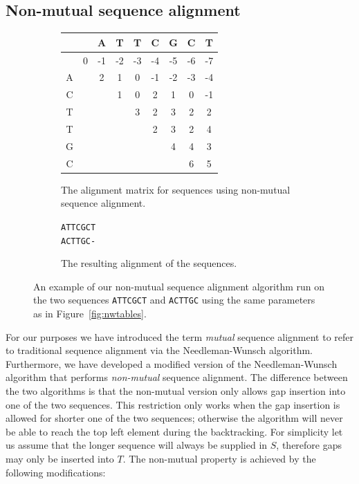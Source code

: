 \documentclass[a4paper]{report}
\begin{document}
\subsection{Non-mutual sequence alignment}
\label{sec:nonmutualalign}

\begin{figure}[t]
    \begin{subfigure}[b]{0.55\textwidth}
        \centering
        \begin{tabular}{| c | c | c | c | c | c | c | c | c |}
            \hline
            & & A & T & T & C & G & C & T \\ \hline
            &\cellcolor[gray]{0.9}0 & -1 & -2 & -3 & -4 & -5 & -6 & -7 \\
            \hline
            A & &\cellcolor[gray]{0.9}2 & 1 & 0 & -1 & -2 & -3 & -4 \\
            \hline
            C & & &\cellcolor[gray]{0.9}1 & 0 & 2 & 1 & 0 & -1 \\ \hline
            T & & & &\cellcolor[gray]{0.9}3 & 2 & 3 & 2 & 2 \\ \hline
            T & & & & &\cellcolor[gray]{0.9}2 & 3 & 2 & 4 \\ \hline
            G & & & & & &\cellcolor[gray]{0.9}4 & 4 & 3 \\ \hline
            C & & & & & & &\cellcolor[gray]{0.9}6 &
            \cellcolor[gray]{0.9}5 \\ \hline
        \end{tabular}
        \caption{The alignment matrix for sequences using non-mutual sequence
        alignment.}
        \label{fig:nonmutmatrix}
    \end{subfigure}
    \quad
    \begin{subfigure}[b]{0.4\textwidth}
        \centering
        \texttt{ATTCGCT\\ACTTGC-}
        \caption{The resulting alignment of the sequences.}
        \label{fig:nonmutalign}
    \end{subfigure}
    \caption{An example of our non-mutual sequence alignment algorithm run on
    the two sequences \texttt{ATTCGCT} and \texttt{ACTTGC} using the same
    parameters as in Figure~\ref{fig:nwtables}.}
    \label{fig:nonmuttables}
\end{figure}

For our purposes we have introduced the term \emph{mutual} sequence alignment
to refer to traditional sequence alignment via the Needleman-Wunsch algorithm.
Furthermore, we have developed a modified version of the Needleman-Wunsch
algorithm that performs \emph{non-mutual} sequence alignment. The difference
between the two algorithms is that the non-mutual version only allows gap
insertion into one of the two sequences. This restriction only works when the
gap insertion is allowed for shorter one of the two sequences; otherwise the
algorithm will never be able to reach the top left element during the
backtracking. For simplicity let us assume that the longer sequence will always
be supplied in $S$, therefore gaps may only be inserted into $T$. The
non-mutual property is achieved by the following modifications:
\end{document}
